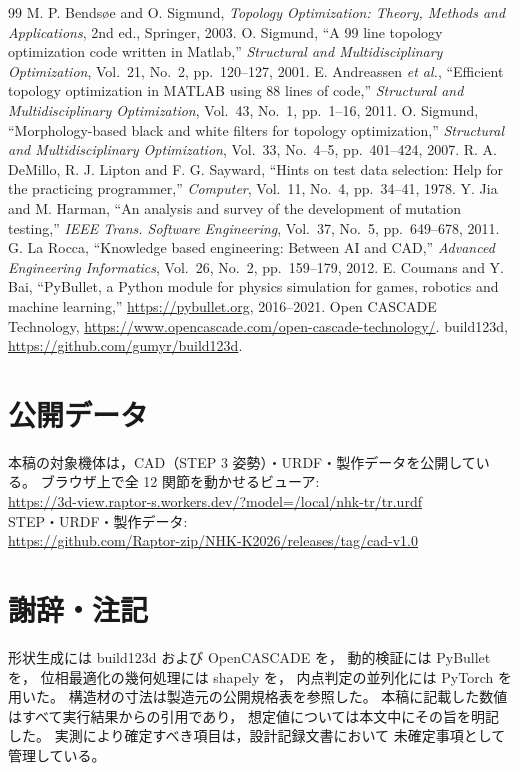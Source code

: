 \documentclass[a4paper,10pt,twocolumn]{ltjsarticle}
\begin{document}
\begin{thebibliography}{99}\footnotesize
{} M. P. Bends{\o}e and O. Sigmund,
\textit{Topology Optimization: Theory, Methods and Applications},
2nd ed., Springer, 2003.
 O. Sigmund,
``A 99 line topology optimization code written in Matlab,''
\textit{Structural and Multidisciplinary Optimization},
Vol.~21, No.~2, pp.~120--127, 2001.
 E. Andreassen \textit{et al.},
``Efficient topology optimization in MATLAB using 88 lines of code,''
\textit{Structural and Multidisciplinary Optimization},
Vol.~43, No.~1, pp.~1--16, 2011.
 O. Sigmund,
``Morphology-based black and white filters for topology optimization,''
\textit{Structural and Multidisciplinary Optimization},
Vol.~33, No.~4--5, pp.~401--424, 2007.
 R. A. DeMillo, R. J. Lipton and F. G. Sayward,
``Hints on test data selection: Help for the practicing programmer,''
\textit{Computer}, Vol.~11, No.~4, pp.~34--41, 1978.
 Y. Jia and M. Harman,
``An analysis and survey of the development of mutation testing,''
\textit{IEEE Trans. Software Engineering},
Vol.~37, No.~5, pp.~649--678, 2011.
 G. La Rocca,
``Knowledge based engineering: Between AI and CAD,''
\textit{Advanced Engineering Informatics},
Vol.~26, No.~2, pp.~159--179, 2012.
 E. Coumans and Y. Bai,
``PyBullet, a Python module for physics simulation for games, robotics and
machine learning,'' \url{https://pybullet.org}, 2016--2021.
 Open CASCADE Technology,
\url{https://www.opencascade.com/open-cascade-technology/}.
 build123d,
\url{https://github.com/gumyr/build123d}.
\end{thebibliography}

\section*{公開データ}

本稿の対象機体は，CAD（STEP 3 姿勢）・URDF・製作データを公開している。
ブラウザ上で全 12 関節を動かせるビューア:\\
\url{https://3d-view.raptor-s.workers.dev/?model=/local/nhk-tr/tr.urdf}\\
STEP・URDF・製作データ:\\
\url{https://github.com/Raptor-zip/NHK-K2026/releases/tag/cad-v1.0}

\section*{謝辞・注記}

形状生成には build123d\cite{build123d} および OpenCASCADE\cite{occt} を，
動的検証には PyBullet\cite{coumans2021} を，
位相最適化の幾何処理には shapely を，
内点判定の並列化には PyTorch を用いた。
構造材の寸法は製造元の公開規格表を参照した。
本稿に記載した数値はすべて実行結果からの引用であり，
想定値については本文中にその旨を明記した。
実測により確定すべき項目は，設計記録文書において
未確定事項として管理している。
\end{document}
